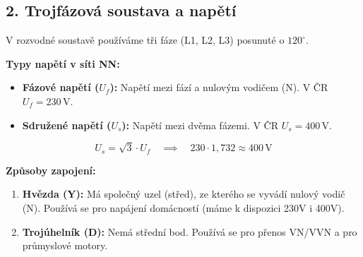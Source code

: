 \documentclass[a4paper,10pt]{article}
\begin{document}
\begin{vysvetlenibox}
\begin{center}
\end{center}

\subsection*{2. Trojfázová soustava a napětí}

V rozvodné soustavě používáme tři fáze (L1, L2, L3) posunuté o $120^\circ$.

\textbf{Typy napětí v síti NN:}
\begin{itemize}
    \item \textbf{Fázové napětí ($U_f$):} Napětí mezi fází a nulovým vodičem (N). V ČR $U_f = 230\,\mathrm{V}$.
    \item \textbf{Sdružené napětí ($U_s$):} Napětí mezi dvěma fázemi. V ČR $U_s = 400\,\mathrm{V}$.
\end{itemize}

\begin{vzorcebox}
\[
U_s = \sqrt{3} \cdot U_f \quad \implies \quad 230 \cdot 1{,}732 \approx 400\,\mathrm{V}
\]
\end{vzorcebox}

\textbf{Způsoby zapojení:}
\begin{enumerate}
    \item \textbf{Hvězda (Y):} Má společný uzel (střed), ze kterého se vyvádí nulový vodič (N). Používá se pro napájení domácností (máme k dispozici 230V i 400V).
    \item \textbf{Trojúhelník (D):} Nemá střední bod. Používá se pro přenos VN/VVN a pro průmyslové motory.
\end{enumerate}

\begin{center}
\end{center}
\end{vysvetlenibox}
\end{document}
